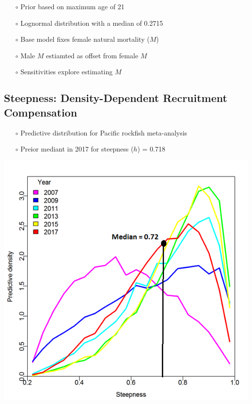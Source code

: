 \documentclass[ignorenonframetext,compress]{beamer}
\begin{document}
\begin{itemize}
\item[$\circ$] Prior based on maximum age of 21
\item[$\circ$] Lognormal distribution with a median of 0.2715
\item[$\circ$] Base model fixes female natural mortality ($M$)
\item[$\circ$] Male $M$ estiamted as offset from female $M$
\item[$\circ$] Sensitivities explore estimating $M$
\end{itemize}

\subsection{Steepness: Density-Dependent Recruitment
Compensation}\label{steepness-density-dependent-recruitment-compensation}

\begin{itemize}
\item[$\circ$] Predictive distribution for Pacific rockfish meta-analysis
\item[$\circ$] Preior mediant in 2017 for steepness ($h$) = 0.718
\end{itemize}

\includegraphics{Figures/h_prior.png}
\end{document}

